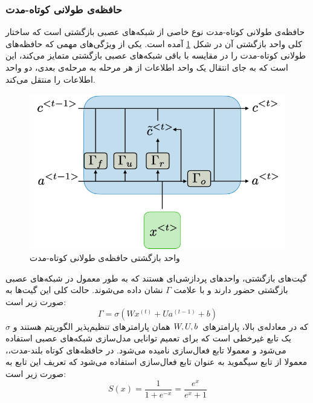 \subsubsection{حافظه‌ی طولانی کوتاه-مدت}
حافظه‌ی طولانی کوتاه-مدت
نوع خاصی از شبکه‌های عصبی بازگشتی است که ساختار کلی  واحد بازگشتی آن در شکل
\ref{fig:lstmblock}
آمده است.
یکی از ویژگی‌های مهمی که حافظه‌های طولانی کوتاه-مدت را در مقایسه با باقی شبکه‌های عصبی بازگشتی متمایز می‌کند، این است که به جای انتقال یک واحد اطلاعات از هر مرحله به مرحله‌ی بعدی، دو واحد اطلاعات را منتقل می‌کند.
\cite{lstm_paper}

\begin{figure}
	\centering
	\includegraphics[scale=0.4]{figures/lstm-rec-unit.png}
	\caption [
	واحد بازگشتی حافظه‌ی طولانی کوتاه-مدت
	]{
	واحد بازگشتی حافظه‌ی طولانی کوتاه-مدت 
	\cite{rnncheat}
	}
	\label{fig:lstmblock}
\end{figure}

گیت‌های بازگشتی، واحدهای پردازشی‌ای هستند که به طور معمول در شبکه‌های عصبی بازگشتی حضور دارند و با علامت 
$\Gamma$
نشان داده می‌شوند. حالت کلی این گیت‌ها به صورت زیر است:
\begin{equation}
    \Gamma = \sigma(Wx^{(t)} + Ua^{(t-1)} + b)
\end{equation}
که در معادله‌ی بالا، پارامترهای
$W, U, b \hspace{0.5mm}$
همان پارامترهای تنظیم‌پذیر الگوریتم هستند و
$\sigma$
یک تابع غیرخطی است که برای تعمیم توانایی مدل‌سازی شبکه‌های عصبی استفاده می‌شود و معمولا تابع فعال‌سازی
نامیده می‌شود.
در حافظه‌های کوتاه بلند-مدت،، معمولا از تابع سیگموید
به عنوان تابع فعال‌سازی استفاده می‌شود که تعریف این تابع به صورت زیر است:
\begin{equation}
    S(x) = \frac{1}{1+e^{-x}} = \frac{e^x}{e^x + 1}
\end{equation}

